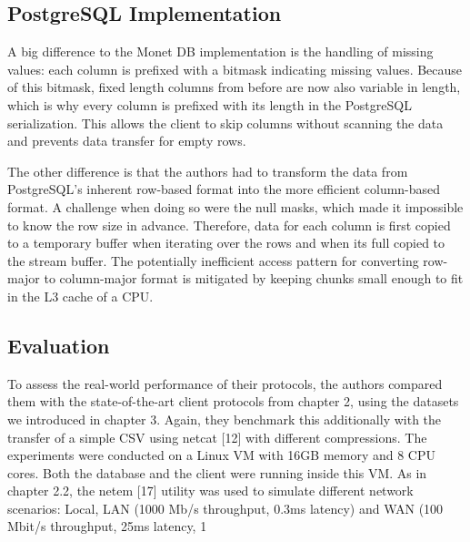 \documentclass[sigconf]{acmart}
\begin{document}
\subsection{PostgreSQL Implementation}
A big difference to the Monet DB implementation is the handling of missing values: each column is prefixed with a bitmask indicating missing values. Because of this bitmask, fixed length columns from before are now also variable in length, which is why every column is prefixed with its length in the PostgreSQL serialization. This allows the client to skip columns without scanning the data and prevents data transfer for empty rows.

The other difference is that the authors had to transform the data from PostgreSQL’s inherent row-based format into the more efficient column-based format. A challenge when doing so were the null masks, which made it impossible to know the row size in advance. Therefore, data for each column is first copied to a temporary buffer when iterating over the rows and when its full copied to the stream buffer. The potentially inefficient access pattern for converting row-major to column-major format is mitigated by keeping chunks small enough to fit in the L3 cache of a CPU.


\subsection{Evaluation}
To assess the real-world performance of their protocols, the authors compared them with the state-of-the-art client protocols from chapter 2, using the datasets we introduced in chapter 3. Again, they benchmark this additionally with the transfer of a simple CSV using netcat [12] with different compressions. The experiments were conducted on a Linux VM with 16GB memory and 8 CPU cores. Both the database and the client were running inside this VM. As in chapter 2.2, the netem [17] utility was used to simulate different network scenarios: Local, LAN (1000 Mb/s throughput, 0.3ms latency) and WAN (100 Mbit/s throughput, 25ms latency, 1%
\end{document}
